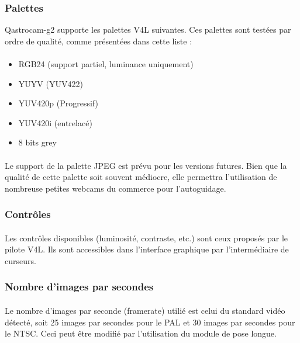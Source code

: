 \documentclass[11pt,a4paper]{book}
\begin{document}
\subsubsection{Palettes}

Qastrocam-g2 supporte les palettes V4L suivantes. Ces palettes sont test\'ees par ordre de qualit\'e,
comme pr\'esent\'ees dans cette liste :

\paragraph*{}
\begin{itemize}
\item RGB24 (support partiel, luminance uniquement)
\item YUYV (YUV422)
\item YUV420p (Progressif)
\item YUV420i (entrelac\'e)
\item 8 bits grey
\end{itemize}

\paragraph*{}
Le support de la palette JPEG est pr\'evu pour les versions futures. Bien que la qualit\'e
de cette palette soit souvent m\'ediocre, elle permettra l'utilisation de nombreuse petites
webcams du commerce pour l'autoguidage.

\subsubsection{Contr\^oles}

\paragraph*{}
Les contr\^oles disponibles (luminosit\'e, contraste, etc.) sont ceux propos\'es par le pilote
V4L. Ils sont accessibles dans l'interface graphique par l'interm\'ediaire de curseurs.

\subsubsection{Nombre d'images par secondes}

\paragraph*{}
Le nombre d'images par seconde (framerate) utili\'e est celui du standard vid\'eo d\'etect\'e,
soit 25 images par secondes pour le PAL et 30 images par secondes pour le NTSC. Ceci peut \^etre
modifi\'e par l'utilisation du module de pose longue.  
\end{document}
